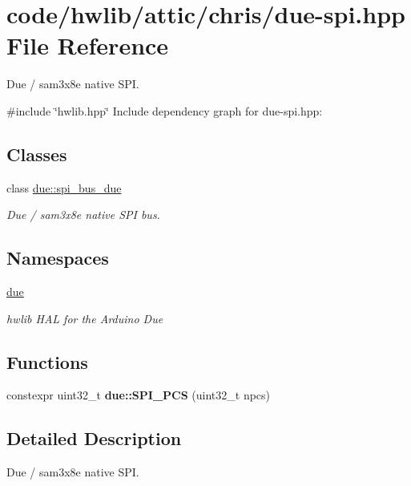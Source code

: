 \hypertarget{due-spi_8hpp}{}\section{code/hwlib/attic/chris/due-\/spi.hpp File Reference}
\label{due-spi_8hpp}


Due / sam3x8e native S\+PI.  


{\ttfamily \#include \char`\"{}hwlib.\+hpp\char`\"{}}\newline
Include dependency graph for due-\/spi.hpp\+:
\subsection*{Classes}
\begin{DoxyCompactItemize}
\item 
class \hyperlink{classdue_1_1spi__bus__due}{due\+::spi\+\_\+bus\+\_\+due}
\begin{DoxyCompactList}\small\item\em Due / sam3x8e native S\+PI bus. \end{DoxyCompactList}\end{DoxyCompactItemize}
\subsection*{Namespaces}
\begin{DoxyCompactItemize}
\item 
 \hyperlink{namespacedue}{due}
\begin{DoxyCompactList}\small\item\em hwlib H\+AL for the Arduino Due \end{DoxyCompactList}\end{DoxyCompactItemize}
\subsection*{Functions}
\begin{DoxyCompactItemize}
\item 
\mbox{\label{namespacedue_af52720fcb38ebf98b8dcf75b1bfc8188}} 
constexpr uint32\+\_\+t {\bfseries due\+::\+S\+P\+I\+\_\+\+P\+CS} (uint32\+\_\+t npcs)
\end{DoxyCompactItemize}


\subsection{Detailed Description}
Due / sam3x8e native S\+PI. 

